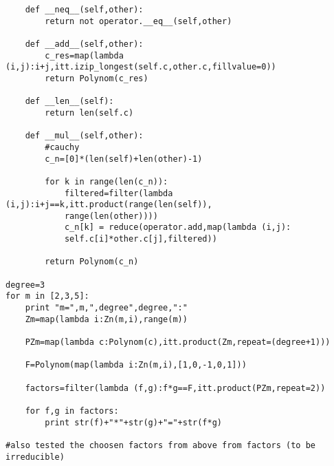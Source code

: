 \documentclass[a4paper,twoside=false,abstract=false,numbers=noenddot,
titlepage=false,headings=small,parskip=half,version=last]{scrartcl}
\theoremstyle{definition}
\theoremstyle{remark}
\begin{document}
\begin{verbatim}
    def __neq__(self,other):
        return not operator.__eq__(self,other)

    def __add__(self,other):
        c_res=map(lambda (i,j):i+j,itt.izip_longest(self.c,other.c,fillvalue=0))
        return Polynom(c_res)
    
    def __len__(self):
        return len(self.c)

    def __mul__(self,other):
        #cauchy
        c_n=[0]*(len(self)+len(other)-1)

        for k in range(len(c_n)): 
            filtered=filter(lambda (i,j):i+j==k,itt.product(range(len(self)),
            range(len(other))))
            c_n[k] = reduce(operator.add,map(lambda (i,j): 
            self.c[i]*other.c[j],filtered))
        
        return Polynom(c_n)

degree=3
for m in [2,3,5]:
    print "m=",m,",degree",degree,":"
    Zm=map(lambda i:Zn(m,i),range(m))

    PZm=map(lambda c:Polynom(c),itt.product(Zm,repeat=(degree+1)))

    F=Polynom(map(lambda i:Zn(m,i),[1,0,-1,0,1])) 

    factors=filter(lambda (f,g):f*g==F,itt.product(PZm,repeat=2))

    for f,g in factors:
        print str(f)+"*"+str(g)+"="+str(f*g)

#also tested the choosen factors from above from factors (to be irreducible)

\end{verbatim}

\end{document}
